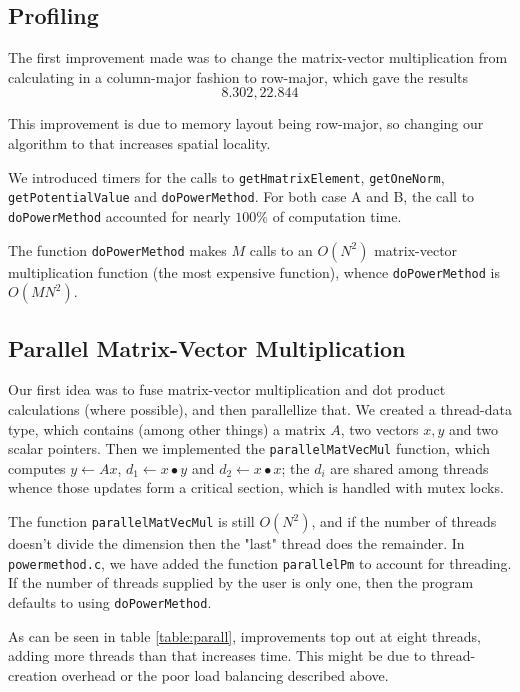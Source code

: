 \documentclass[a4paper, 11pt]{article}
\begin{document}
\subsection{Profiling}

The first improvement made was to change the matrix-vector multiplication from calculating in a column-major fashion to row-major, which gave the results
$$8.302, 22.844$$

This improvement is due to memory layout being row-major, so changing our algorithm to that increases spatial locality.

We introduced timers for the calls to \texttt{getHmatrixElement}, \texttt{getOneNorm}, \texttt{getPotentialValue} and \texttt{doPowerMethod}. For both case A and B, the call to \texttt{doPowerMethod} accounted for nearly $100\%$ of computation time.

The function \texttt{doPowerMethod} makes $M$ calls to an $O(N^2)$ matrix-vector multiplication function (the most expensive function), whence \texttt{doPowerMethod} is $O(MN^2)$.

\subsection{Parallel Matrix-Vector Multiplication}

Our first idea was to fuse matrix-vector multiplication and dot product calculations (where possible), and then parallellize that. We created a thread-data type, which contains (among other things) a matrix $A$, two vectors $x,y$ and two scalar pointers. Then we implemented the \texttt{parallelMatVecMul} function, which computes $y \leftarrow Ax$, $d_1 \leftarrow x\bullet y$ and $d_2 \leftarrow x\bullet x$; the $d_i$ are shared among threads whence those updates form a critical section, which is handled with mutex locks.

The function \texttt{parallelMatVecMul} is still $O(N^2)$, and if the number of threads doesn't divide the dimension then the "last" thread does the remainder. In \texttt{powermethod.c}, we have added the function \texttt{parallelPm} to account for threading. If the number of threads supplied by the user is only one, then the program defaults to using \texttt{doPowerMethod}.

As can be seen in table \ref{table:parall}, improvements top out at eight threads, adding more threads than that increases time. This might be due to thread-creation overhead or the poor load balancing described above.
\end{document}
